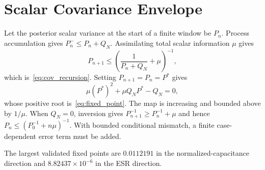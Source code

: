 \section{Scalar Covariance Envelope}
\label{app:covariance}

Let the posterior scalar variance at the start of a finite window be $P_n$. Process accumulation gives $P_n^-\le P_n+Q_N$. Assimilating total scalar information $\mu$ gives
\begin{equation}
P_{n+1}\le\left(\frac{1}{P_n+Q_N}+\mu\right)^{-1},
\end{equation}
which is~\eqref{eq:cov_recursion}. Setting $P_{n+1}=P_n=P^*$ gives
\begin{equation}
\mu(P^*)^2+\mu Q_NP^*-Q_N=0,
\end{equation}
whose positive root is~\eqref{eq:fixed_point}. The map is increasing and bounded above by $1/\mu$. When $Q_N=0$, inversion gives $P_{n+1}^{-1}\ge P_n^{-1}+\mu$ and hence $P_n\le(P_0^{-1}+n\mu)^{-1}$. With bounded conditional mismatch, a finite case-dependent error term must be added.

The largest validated fixed points are $0.0112191$ in the normalized-capacitance direction and $8.82437\times10^{-6}$ in the ESR direction.
